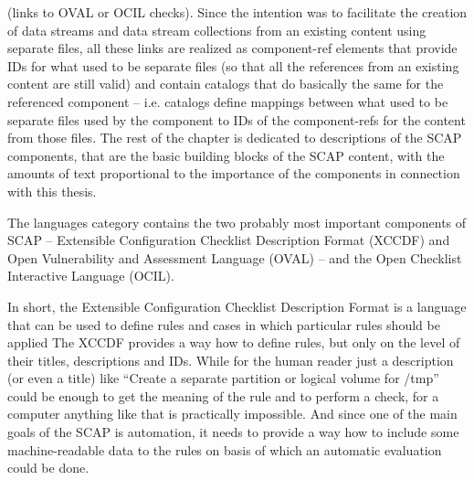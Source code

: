 \documentclass[../main.tex]{subfiles}
\begin{document}
(links to OVAL or OCIL checks). Since the intention was to facilitate
the creation of data streams and data stream collections from
an existing content using separate files, all these links are realized
as component-ref elements that provide IDs for what used to be
separate files (so that all the references from an existing content are
still valid) and contain catalogs that do basically the same for the
referenced component – i.e. catalogs define mappings between
what used to be separate files used by the component to IDs of the
component-refs for the content from those files.
The rest of the chapter is dedicated to descriptions of the SCAP
components, that are the basic building blocks of the SCAP content,
with the amounts of text proportional to the importance of the components
in connection with this thesis.

The languages category contains the two probably most important
components of SCAP – Extensible Configuration Checklist Description
Format (XCCDF) and Open Vulnerability and Assessment Language
(OVAL) – and the Open Checklist Interactive Language (OCIL).

In short, the Extensible Configuration Checklist Description Format
is a language that can be used to define rules and cases in which
particular rules should be applied
The XCCDF provides a way how to define rules, but only on
the level of their titles, descriptions and IDs. While for the human
reader just a description (or even a title) like “Create a separate partition
or logical volume for /tmp” could be enough to get the meaning
of the rule and to perform a check, for a computer anything like
that is practically impossible. And since one of the main goals of the
SCAP is automation, it needs to provide a way how to include some
machine-readable data to the rules on basis of which an automatic
evaluation could be done.
\end{document}
